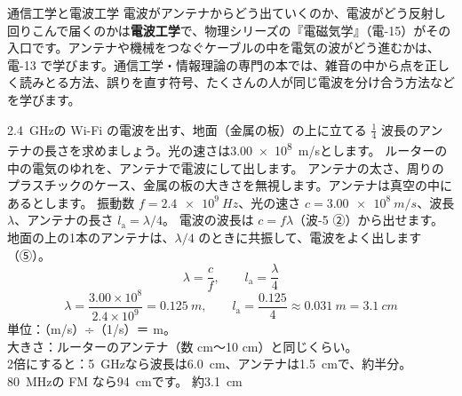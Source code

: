 \begin{phsaki}{通信工学と電波工学}
電波がアンテナからどう出ていくのか、電波がどう反射し回りこんで届くのかは\textbf{電波工学}で、物理シリーズの『電磁気学』（電-15）がその入口です。アンテナや機械をつなぐケーブルの中を電気の波がどう進むかは、電-13 で学びます。通信工学・情報理論の専門の本では、雑音の中から点を正しく読みとる方法、誤りを直す符号、たくさんの人が同じ電波を分け合う方法などを学びます。
\end{phsaki}

\begin{kotoba}\small
{}
\end{kotoba}


\begin{phreidai}[Wi-Fi のアンテナの長さ]\label{ph:波-14:ex1}
\qty{2.4}{GHz}の Wi-Fi の電波を出す、地面（金属の板）の上に立てる $\tfrac14$ 波長のアンテナの長さを求めましょう。光の速さは\qty{3.00e8}{m/s}とします。
\phbamen
ルーターの中の電気のゆれを、アンテナで電波にして出します。
\phmushi
アンテナの太さ、周りのプラスチックのケース、金属の板の大きさを無視します。アンテナは真空の中にあるとします。
\phzu
振動数 $f=\qty{2.4e9}{Hz}$、光の速さ $c=\qty{3.00e8}{m/s}$、波長 $\lambda$、アンテナの長さ $l_{\mathrm a}=\lambda/4$。
\phriyu
電波の波長は $c=f\lambda$（波-5 ②）から出せます。地面の上の1本のアンテナは、$\lambda/4$ のときに共振して、電波をよく出します（⑤）。
\phtateru
\[\lambda=\frac{c}{f},\qquad l_{\mathrm a}=\frac{\lambda}{4}\]
\phtoku
\[\lambda=\frac{3.00\times10^8}{2.4\times10^9}=\qty{0.125}{m},\qquad l_{\mathrm a}=\frac{0.125}{4}\approx\qty{0.031}{m}=\qty{3.1}{cm}\]
\phtashikame
単位：（m/s）÷（1/s）＝ m。\\
大きさ：ルーターのアンテナ（数 cm〜10 cm）と同じくらい。\\
2倍にすると：\qty{5}{GHz}なら波長は\qty{6.0}{cm}、アンテナは\qty{1.5}{cm}で、約半分。\qty{80}{MHz}の FM なら\qty{94}{cm}です。
\kotae 約\qty{3.1}{cm}
\end{phreidai}

